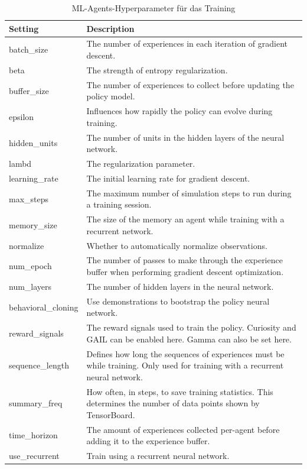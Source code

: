 \smallskip
\begin{table}[H]
\begin{tabular} {|  p{3.2cm}  |  p{12.4cm}  |} \hline
\textbf{Setting} & \textbf{Description} \\ \hline
batch\_size & The number of experiences in each iteration of gradient descent. \\ \hline
beta & The strength of entropy regularization. \\ \hline
buffer\_size & The number of experiences to collect before updating the policy model. \\ \hline
epsilon & Influences how rapidly the policy can evolve during training. \\ \hline
hidden\_units & The number of units in the hidden layers of the neural network. \\ \hline
lambd & The regularization parameter. \\ \hline
learning\_rate & The initial learning rate for gradient descent. \\ \hline
max\_steps & The maximum number of simulation steps to run during a training session. \\ \hline
memory\_size & The size of the memory an agent while training with a recurrent network. \\ \hline
normalize & Whether to automatically normalize observations. \\ \hline
num\_epoch & The number of passes to make through the experience buffer when performing gradient descent optimization. \\ \hline
num\_layers & The number of hidden layers in the neural network. \\ \hline
behavioral\_cloning & Use demonstrations to bootstrap the policy neural network. \\ \hline
reward\_signals & The reward signals used to train the policy. Curiosity and GAIL can be enabled here. Gamma can also be set here. \\ \hline
sequence\_length & Defines how long the sequences of experiences must be while training. Only used for training with a recurrent neural network. \\ \hline
summary\_freq & How often, in steps, to save training statistics. This determines the number of data points shown by TensorBoard. \\ \hline
time\_horizon & The amount of experiences collected per-agent before adding it to the experience buffer. \\ \hline
use\_recurrent & Train using a recurrent neural network. \\ \hline
\end{tabular}
\caption{ML-Agents-Hyperparameter für das Training \cite{ml-agents_documentation}}
\label{tab:ml-agents_training_hyperparameters}
\end{table}

